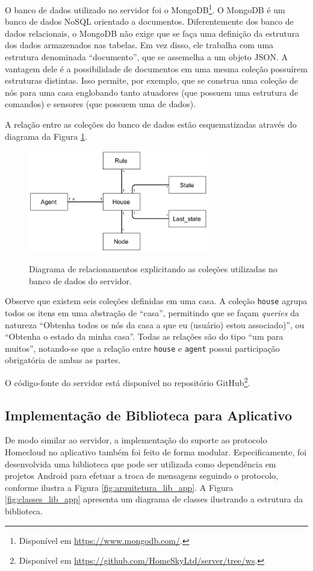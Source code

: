 O banco de dados utilizado no servidor foi o MongoDB\footnote{Disponível em \url{https://www.mongodb.com/}.}. O MongoDB é um banco de dados NoSQL orientado a documentos. Diferentemente dos banco de dados relacionais, o MongoDB não exige que se faça uma definição da estrutura dos dados armazenados nas tabelas. Em vez disso, ele trabalha com uma estrutura denominada ``documento'', que se assemelha a um objeto JSON. A vantagem dele é a possibilidade de documentos em uma mesma coleção possuírem estruturas distintas. Isso permite, por exemplo, que se construa uma coleção de nós para uma casa englobando tanto atuadores (que possuem uma estrutura de comandos) e sensores (que possuem uma de dados).

A relação entre as coleções do banco de dados estão esquematizadas através do diagrama da Figura \ref{fig:servidor_bd}.

\begin{figure}[h]
	\centering
	\caption{Diagrama de relacionamentos explicitando as coleções utilizadas no banco de dados do servidor.}
  \includegraphics[width=0.7\textwidth]{imagens/servidor_bd.png}
  \label{fig:servidor_bd}  
\end{figure}

Observe que existem seis coleções definidas em uma casa. A coleção \texttt{house} agrupa todos os itens em uma abstração de ``casa'', permitindo que se façam \textit{queries} da natureza ``Obtenha todos os nós da casa a que eu (usuário) estou associado)'', ou ``Obtenha o estado da minha casa''. Todas as relações são do tipo ``um para muitos'', notando-se que a relação entre \texttt{house} e \texttt{agent} possui participação obrigatória de ambas as partes.

O código-fonte do servidor está disponível no repositório GitHub\footnote{Disponível em \url{https://github.com/HomeSkyLtd/server/tree/ws}.}.

\subsection{Implementação de Biblioteca para Aplicativo} \label{subsec:lib_app}
De modo similar ao servidor, a implementação do suporte ao protocolo Homecloud no aplicativo também foi feito de forma modular. Especificamente, foi desenvolvida uma biblioteca que pode ser utilizada como dependência em projetos Android para efetuar a troca de mensagens seguindo o protocolo, conforme ilustra a Figura \ref{fig:arquitetura_lib_app}. A Figura \ref{fig:classes_lib_app} apresenta um diagrama de classes ilustrando a estrutura da biblioteca.


